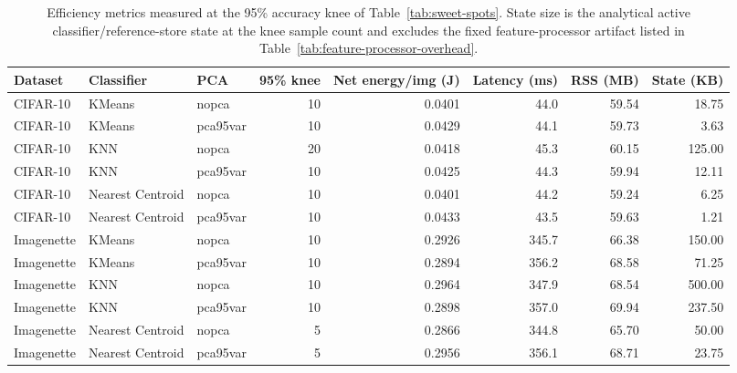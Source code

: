 \documentclass[sigconf,review,nonacm]{acmart}
\begin{document}
\begin{table}[t]
  \caption{Efficiency metrics measured at the 95\% accuracy knee of Table~\ref{tab:sweet-spots}. State size is the analytical active classifier/reference-store state at the knee sample count and excludes the fixed feature-processor artifact listed in Table~\ref{tab:feature-processor-overhead}.}
  \label{tab:sweet-spots-eff}
  \centering
  \footnotesize
  \begin{tabular}{@{}lllrrrrr@{}}
    \toprule
    Dataset & Classifier & PCA & 95\% knee & Net energy/img (J) & Latency (ms) & RSS (MB) & State (KB) \\
    \midrule
    CIFAR-10 & KMeans & nopca & 10 & 0.0401 & 44.0 & 59.54 & 18.75 \\
    CIFAR-10 & KMeans & pca95var & 10 & 0.0429 & 44.1 & 59.73 & 3.63 \\
    CIFAR-10 & KNN & nopca & 20 & 0.0418 & 45.3 & 60.15 & 125.00 \\
    CIFAR-10 & KNN & pca95var & 10 & 0.0425 & 44.3 & 59.94 & 12.11 \\
    CIFAR-10 & Nearest Centroid & nopca & 10 & 0.0401 & 44.2 & 59.24 & 6.25 \\
    CIFAR-10 & Nearest Centroid & pca95var & 10 & 0.0433 & 43.5 & 59.63 & 1.21 \\
    Imagenette & KMeans & nopca & 10 & 0.2926 & 345.7 & 66.38 & 150.00 \\
    Imagenette & KMeans & pca95var & 10 & 0.2894 & 356.2 & 68.58 & 71.25 \\
    Imagenette & KNN & nopca & 10 & 0.2964 & 347.9 & 68.54 & 500.00 \\
    Imagenette & KNN & pca95var & 10 & 0.2898 & 357.0 & 69.94 & 237.50 \\
    Imagenette & Nearest Centroid & nopca & 5 & 0.2866 & 344.8 & 65.70 & 50.00 \\
    Imagenette & Nearest Centroid & pca95var & 5 & 0.2956 & 356.1 & 68.71 & 23.75 \\
    \bottomrule
  \end{tabular}
\end{table}
\end{document}
